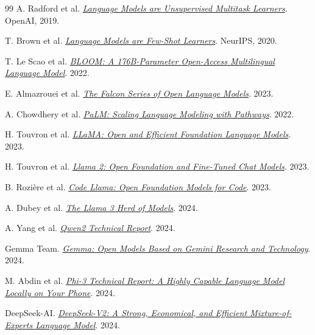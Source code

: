 \documentclass[UTF8,fontset=none,a4paper,10pt]{ctexart}
\begin{document}
\begin{thebibliography}{99}
A. Radford et al. \href{https://cdn.openai.com/better-language-models/language_models_are_unsupervised_multitask_learners.pdf}{\textit{Language Models are Unsupervised Multitask Learners}}. OpenAI, 2019.

T. Brown et al. \href{https://arxiv.org/abs/2005.14165}{\textit{Language Models are Few-Shot Learners}}. NeurIPS, 2020.

T. Le Scao et al. \href{https://arxiv.org/abs/2211.05100}{\textit{BLOOM: A 176B-Parameter Open-Access Multilingual Language Model}}. 2022.

E. Almazrouei et al. \href{https://arxiv.org/abs/2311.16867}{\textit{The Falcon Series of Open Language Models}}. 2023.

A. Chowdhery et al. \href{https://arxiv.org/abs/2204.02311}{\textit{PaLM: Scaling Language Modeling with Pathways}}. 2022.

H. Touvron et al. \href{https://arxiv.org/abs/2302.13971}{\textit{LLaMA: Open and Efficient Foundation Language Models}}. 2023.

H. Touvron et al. \href{https://arxiv.org/abs/2307.09288}{\textit{Llama 2: Open Foundation and Fine-Tuned Chat Models}}. 2023.

B. Rozière et al. \href{https://arxiv.org/abs/2308.12950}{\textit{Code Llama: Open Foundation Models for Code}}. 2023.

A. Dubey et al. \href{https://arxiv.org/abs/2407.21783}{\textit{The Llama 3 Herd of Models}}. 2024.

A. Yang et al. \href{https://arxiv.org/abs/2407.10671}{\textit{Qwen2 Technical Report}}. 2024.

Gemma Team. \href{https://arxiv.org/abs/2403.08295}{\textit{Gemma: Open Models Based on Gemini Research and Technology}}. 2024.

M. Abdin et al. \href{https://arxiv.org/abs/2404.14219}{\textit{Phi-3 Technical Report: A Highly Capable Language Model Locally on Your Phone}}. 2024.

DeepSeek-AI. \href{https://arxiv.org/abs/2405.04434}{\textit{DeepSeek-V2: A Strong, Economical, and Efficient Mixture-of-Experts Language Model}}. 2024.


\end{thebibliography}
\end{document}
